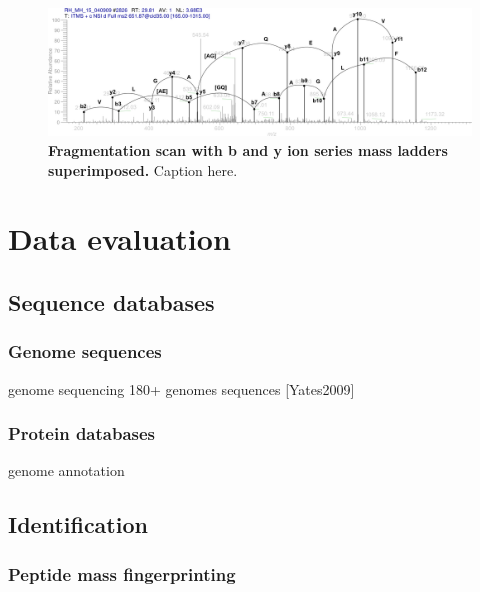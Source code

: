 \begin{figure}[h]
\includegraphics[width=\textwidth]{figures/ms2-scan-b-y-1.jpg}
\caption{
{\bf Fragmentation scan with b and y ion series mass ladders superimposed.} 
Caption here.
}
\label{fig:fragmentation-scan-b-y}
\end{figure}


\section{Data evaluation}

\subsection{Sequence databases}

\subsubsection{Genome sequences}

\begin{todo}
genome sequencing
180+ genomes sequences [Yates2009]
\end{todo}

\subsubsection{Protein databases}

\begin{todo}
genome annotation
\end{todo}

\subsection{Identification}

\subsubsection{Peptide mass fingerprinting}


